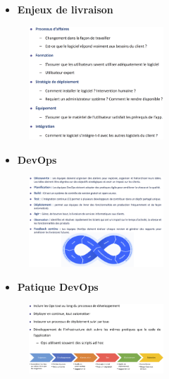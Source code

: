 \documentclass[16pt]{report}
\begin{document}
\begin{multicols*}{2}
    \begin{itemize}
        \item \textbf{Enjeux de livraison}  
    \end{itemize}


    \begin{figure}[H]
        \begin{center}
            \includegraphics[width=0.45\textwidth]{Deploiement6.png}
        \end{center}
    \end{figure}


    \begin{itemize}
        \item \textbf{DevOps}  
    \end{itemize}



    \begin{figure}[H]
        \begin{center}
            \includegraphics[width=0.45\textwidth]{DevOps.png}
        \end{center}
    \end{figure}


    \pagebreak

    \begin{itemize}
        \item \textbf{Patique DevOps}  
    \end{itemize}


     \begin{figure}[H]
        \begin{center}
            \includegraphics[width=0.45\textwidth]{DevOps2.png}
        \end{center}
    \end{figure}



\end{multicols*}
\end{document}
